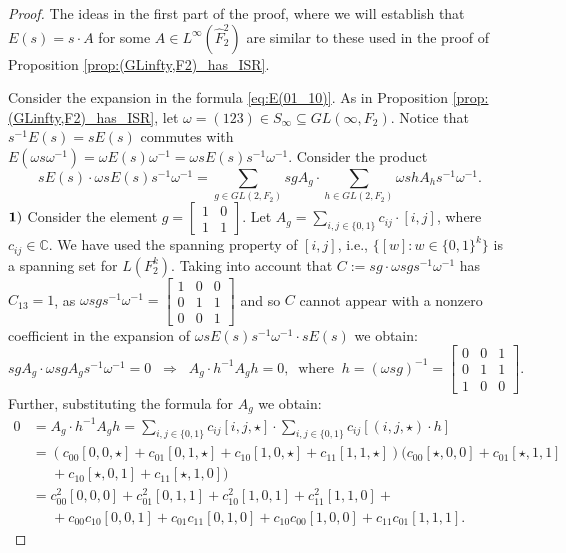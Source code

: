 \documentclass[10pt,a4paper]{amsart}
\begin{document}
\begin{proof}
The ideas in the first part of the proof, where we will establish that $E(s) = s \cdot A$ for some $A \in L^\infty(\widehat{ F}_2^2)$  are similar to these used in the proof of Proposition \ref{prop:(GLinfty,F2)_has_ISR}. 

Consider the expansion in the formula \eqref{eq:E(01_10)}. As in Proposition \ref{prop:(GLinfty,F2)_has_ISR}, let $\omega=(123)\in S_\infty\subseteq GL(\infty, F_2)$. Notice that $s^{-1} E(s)=sE(s)$ commutes with $E(\omega s\omega^{-1})=\omega E(s)\omega^{-1}=\omega sE(s)s^{-1}\omega^{-1}$. Consider the product
$$sE(s)\cdot \omega sE(s)s^{-1}\omega^{-1}=\sum\limits_{g\in GL(2, F_2)}sgA_g\cdot \sum\limits_{h\in GL(2, F_2)} \omega shA_hs^{-1}\omega^{-1}.$$
\vskip 0.1cm\noindent
${\bf 1)}$ Consider the element $g=\begin{bmatrix}
	1&0\\1&1
\end{bmatrix}$. Let $A_g=\sum\limits_{i,j\in\{0,1\}}c_{ij}\cdot [i,j]$, where $c_{ij}\in\mathbb C$. We have used the spanning property of $[i,j]$, i.e., $\{[w]: w\in \{0,1\}^k\}$ is a spanning set for $L(F_2^k)$. Taking into account that $C:=sg\cdot \omega sgs^{-1}\omega^{-1}$ has $C_{13}=1$, as  $\omega sgs^{-1}\omega^{-1} = \begin{bmatrix}
	1&0&0\\0&1&1\\0&0&1
\end{bmatrix}$ and so $C$ cannot appear with a nonzero coefficient in the expansion of $\omega sE(s)s^{-1}\omega^{-1}\cdot sE(s)$ we obtain:
$$sgA_g\cdot \omega sgA_gs^{-1}\omega^{-1}=0\;\;\Longrightarrow\;\; A_g\cdot h^{-1} A_gh=0,\;\;\text{where}\;\; h=(\omega sg)^{-1}=\begin{bmatrix}
	0&0&1\\0&1&1\\1&0&0
\end{bmatrix}.$$ 
Further, substituting the formula for $A_g$ we obtain:
\begin{align*}0&=A_g\cdot h^{-1} A_gh=\sum\limits_{i,j\in\{0,1\}}c_{ij}[i,j,\star]\cdot\sum\limits_{i,j\in\{0,1\}}c_{ij}[(i,j,\star)\cdot h]\\&=
	(c_{00}[0,0,\star]+c_{01}[0,1,\star]+c_{10}[1,0,\star]+c_{11}[1,1,\star])(c_{00}[\star,0,0]+c_{01}[\star,1,1]\\& \;\;\;\;\;+c_{10}[\star,0,1]+c_{11}[\star,1,0])\\&=
	c_{00}^2[0,0,0]+c_{01}^2[0,1,1]+c_{10}^2[1,0,1]+c_{11}^2[1,1,0]+
    \\& \;\;\;\;\;+c_{00}c_{10}[0,0,1]+c_{01}c_{11}[0,1,0]+c_{10}c_{00}[1,0,0]+c_{11}c_{01}[1,1,1].\end{align*}

\end{proof}
\end{document}
